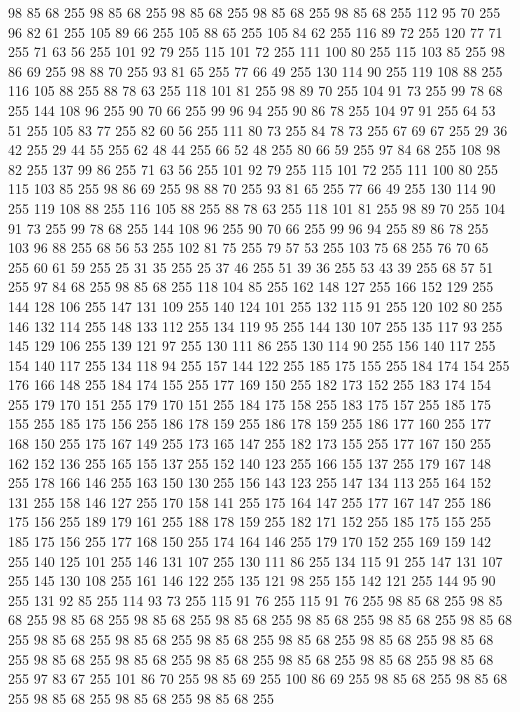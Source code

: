 98 85 68 255 98 85 68 255 98 85 68 255 98 85 68 255 98 85 68 255 112 95 70 255 96 82 61 255 105 89 66 255 105 88 65 255 105 84 62 255 116 89 72 255 120 77 71 255 71 63 56 255 101 92 79 255 115 101 72 255 111 100 80 255 115 103 85 255 98 86 69 255 98 88 70 255 93 81 65 255 77 66 49 255 130 114 90 255 119 108 88 255 116 105 88 255 88 78 63 255 118 101 81 255 98 89 70 255 104 91 73 255 99 78 68 255 144 108 96 255 90 70 66 255 99 96 94 255 90 86 78 255 104 97 91 255 64 53 51 255 105 83 77 255 82 60 56 255 111 80 73 255 84 78 73 255 67 69 67 255 29 36 42 255 29 44 55 255 62 48 44 255 66 52 48 255 80 66 59 255 97 84 68 255 108 98 82 255 137 99 86 255 71 63 56 255 101 92 79 255 115 101 72 255 111 100 80 255 115 103 85 255 98 86 69 255 98 88 70 255 93 81 65 255 77 66 49 255 130 114 90 255 119 108 88 255 116 105 88 255 88 78 63 255 118 101 81 255 98 89 70 255 104 91 73 255
99 78 68 255 144 108 96 255 90 70 66 255 99 96 94 255 89 86 78 255 103 96 88 255 68 56 53 255 102 81 75 255 79 57 53 255 103 75 68 255 76 70 65 255 60 61 59 255 25 31 35 255 25 37 46 255 51 39 36 255 53 43 39 255 68 57 51 255 97 84 68 255 98 85 68 255 118 104 85 255 162 148 127 255 166 152 129 255 144 128 106 255 147 131 109 255 140 124 101 255 132 115 91 255 120 102 80 255 146 132 114 255 148 133 112 255 134 119 95 255 144 130 107 255 135 117 93 255 145 129 106 255 139 121 97 255 130 111 86 255 130 114 90 255 156 140 117 255 154 140 117 255 134 118 94 255 157 144 122 255 185 175 155 255 184 174 154 255 176 166 148 255 184 174 155 255 177 169 150 255 182 173 152 255 183 174 154 255 179 170 151 255 179 170 151 255 184 175 158 255 183 175 157 255 185 175 155 255 185 175 156 255 186 178 159 255 186 178 159 255 186 177 160 255 177 168 150 255 175 167 149 255 173 165 147 255 182 173 155 255 177 167 150 255 162 152 136 255 165 155 137 255 152 140 123 255
166 155 137 255 179 167 148 255 178 166 146 255 163 150 130 255 156 143 123 255 147 134 113 255 164 152 131 255 158 146 127 255 170 158 141 255 175 164 147 255 177 167 147 255 186 175 156 255 189 179 161 255 188 178 159 255 182 171 152 255 185 175 155 255 185 175 156 255 177 168 150 255 174 164 146 255 179 170 152 255 169 159 142 255 140 125 101 255 146 131 107 255 130 111 86 255 134 115 91 255 147 131 107 255 145 130 108 255 161 146 122 255 135 121 98 255 155 142 121 255 144 95 90 255 131 92 85 255 114 93 73 255 115 91 76 255 115 91 76 255 98 85 68 255 98 85 68 255 98 85 68 255 98 85 68 255 98 85 68 255 98 85 68 255 98 85 68 255 98 85 68 255 98 85 68 255 98 85 68 255 98 85 68 255 98 85 68 255 98 85 68 255 98 85 68 255 98 85 68 255 98 85 68 255 98 85 68 255 98 85 68 255 98 85 68 255 98 85 68 255 97 83 67 255 101 86 70 255 98 85 69 255 100 86 69 255 98 85 68 255 98 85 68 255 98 85 68 255 98 85 68 255 98 85 68 255
